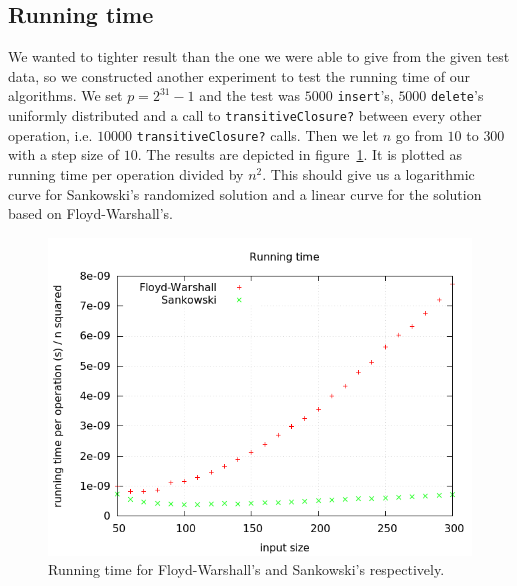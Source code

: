 \documentclass[a4paper,oneside,article,11pt]{memoir}
\begin{document}
\subsection{Running time}
We wanted to tighter result than the one we were able to give from the given test data, so we constructed another experiment to test the running time of our algorithms. We set $p=2^{31}-1$ and the test was $5000$ \texttt{insert}'s, $5000$ \texttt{delete}'s uniformly distributed and a call to \texttt{transitiveClosure?} between every other operation, i.e. $10000$ \texttt{transitiveClosure?} calls. Then we let $n$ go from $10$ to $300$ with a step size of $10$. The results are depicted in figure~\ref{fig:running}. It is plotted as running time per operation divided by $n^2$. This should give us a logarithmic curve for Sankowski's randomized solution and a linear curve for the solution based on Floyd-Warshall's.

\begin{figure}[ht]
\includegraphics[width=\textwidth]{images/running-time-GOOD.png}
\caption{Running time for Floyd-Warshall's and Sankowski's respectively.}
\label{fig:running}
\end{figure}
\end{document}
